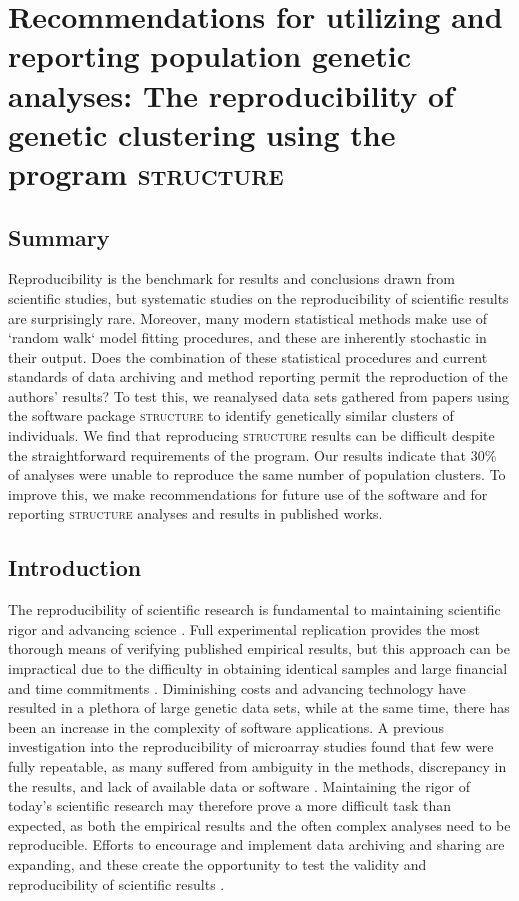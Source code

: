 \chapter{Recommendations for utilizing and reporting population genetic analyses: The 
reproducibility of genetic clustering using the program \textsc{structure}}
\label{chap:reproducibility}

\section{Summary}

Reproducibility is the benchmark for results and conclusions drawn from scientific studies, 
but systematic studies on the reproducibility of scientific results are surprisingly rare. 
Moreover, many modern statistical methods make use of `random walk` model fitting procedures, 
and these are inherently stochastic in their output. Does the combination of these statistical 
procedures and current standards of data archiving and method reporting permit the reproduction 
of the authors' results? To test this, we reanalysed data sets gathered from papers using the 
software package \textsc{structure} to identify genetically similar clusters of individuals. We find 
that reproducing \textsc{structure} results can be difficult despite the straightforward requirements 
of the program. Our results indicate that 30\% of analyses were unable to reproduce the same 
number of population clusters. To improve this, we make recommendations for future use of the 
software and for reporting \textsc{structure} analyses and results in published works.

\section{Introduction}
The reproducibility of scientific research is fundamental to maintaining scientific rigor 
and advancing science \citep{Price:2011}. Full experimental replication provides the most thorough 
means of verifying published empirical results, but this approach can be impractical due to 
the difficulty in obtaining identical samples and large financial and time commitments 
\citep{Peng:2011}. Diminishing costs and advancing technology have resulted in a plethora of large 
genetic data sets, while at the same time, there has been an increase in the complexity of 
software applications. A previous investigation into the reproducibility of microarray studies 
found that few were fully repeatable, as many suffered from ambiguity in the methods, discrepancy 
in the results, and lack of available data or software \citep{Ioannidis:2009}. Maintaining 
the rigor of today's scientific research may therefore prove a more difficult task than expected, 
as both the empirical results and the often complex analyses need to be reproducible. Efforts to 
encourage and implement data archiving and sharing are expanding, and these create the opportunity 
to test the validity and reproducibility of scientific results \citep{Whitlock:2010}.

